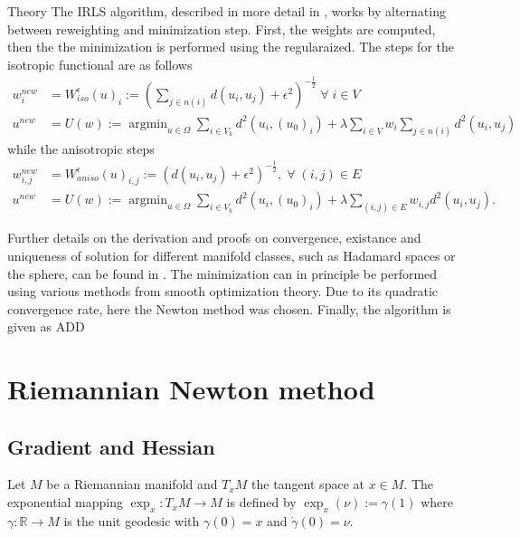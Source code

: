 \begin{chapter}{Theory}
The IRLS algorithm, described in more detail in \cite{Rodriguez}, works by alternating between reweighting and minimization step. First, the weights are computed, then 
the the minimization is performed using the regularaized. The steps for the isotropic functional are as follows
\begin{align}
    w_{i}^{new} &= W^{\epsilon}_{iso}(u)_i := \left( \sum_{j\in n(i)}d(u_i,u_j)+\epsilon^2\right)^{-\frac{1}{2}}\; \forall\;i\in V \\
    u^{new} &= U(w) := \operatorname{argmin}_{u\in\Omega}\sum_{i\in V_k}d^2(u_i,(u_0)_{i})+\lambda\sum_{i\in V}w_i\sum_{j\in n(i)}d^2(u_i,u_j)
\end{align}
while the anisotropic steps
\begin{align}
    w_{i,j}^{new} &= W^{\epsilon}_{aniso}(u)_{i,j} := \left( d(u_i,u_j)+\epsilon^2\right)^{-\frac{1}{2}},\; \forall\;(i,j)\in E \\
    u^{new} &= U(w) := \operatorname{argmin}_{u\in\Omega}\sum_{i\in V_k}d^2(u_i,(u_0)_{i})+\lambda\sum_{(i,j)\in E}w_{i,j}d^2(u_i,u_j).
\end{align}

Further details on the derivation and proofs on convergence, existance and uniqueness of solution for different manifold classes, such as Hadamard spaces or the sphere,
can be found in \cite{SprecherIRLS}. The minimization can in principle be performed using various methods from smooth optimization theory. Due to its quadratic
convergence rate, here the Newton method was chosen. Finally, the algorithm is given as ADD


\section{Riemannian Newton method} %
\label{sec:Riemannian Newton method}

\subsection{Gradient and Hessian} %
\label{sub:Gradient and Hessian}
Let $M$ be a Riemannian manifold and $T_xM$ the tangent space at $x\in M$. The exponential mapping $\exp_x:T_xM\to M$ is defined by $\exp_x(\nu):=\gamma(1)$ where 
$\gamma:\mathbb{R}\to M$ is the unit geodesic with $\gamma(0)=x$ and $\dot{\gamma}(0)=\nu$.





\end{chapter}
